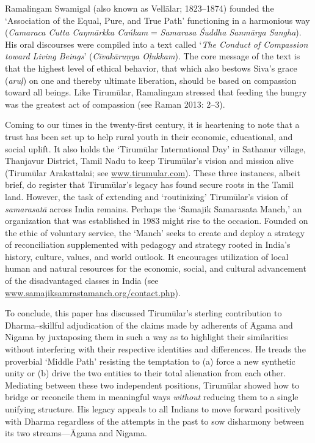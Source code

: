 Ramalingam Swamigal (also known as Vellālar; 1823–1874) founded the ‘Association of the Equal, Pure, and True Path’ functioning in a harmonious way (\textit{Camaraca Cutta Caŋmārkka Cańkam} = \textit{Samarasa Śuddha Sanmārga Sangha}). His oral discourses were compiled into a text called ‘\textit{The Conduct of Compassion toward Living Beings}’ (\textit{Cīvakāruṇya Oļukkam}). The core message of the text is that the highest level of ethical behavior, that which also bestows Siva’s grace (\textit{aruļ}) on one and thereby ultimate liberation, should be based on compassion toward all beings. Like Tirumūlar, Ramalingam stressed that feeding the hungry was the greatest act of compassion (see Raman 2013: 2–3).

Coming to our times in the twenty-first century, it is heartening to note that a trust has been set up to help rural youth in their economic, educational, and social uplift. It also holds the ‘Tirumūlar International Day’ in Sathanur village, Thanjavur District, Tamil Nadu to keep Tirumūlar’s vision and mission alive (Tirumūlar Arakattalai; see \url{www.tirumular.com}). These three instances, albeit brief, do register that Tirumūlar’s legacy has found secure roots in the Tamil land. However, the task of extending and ‘routinizing’ Tirumūlar’s vision of \textit{samarasatā} across India remains. Perhaps the ‘Samajik Samarasata Manch,’ an organization that was established in 1983 might rise to the occasion. Founded on the ethic of voluntary service, the ‘Manch’ seeks to create and deploy a strategy of reconciliation supplemented with pedagogy and strategy rooted in India’s history, culture, values, and world outlook. It encourages utilization of local human and natural resources for the economic, social, and cultural advancement of the disadvantaged classes in India (see \url{www.samajiksamrastamanch.org/contact.php}).

To conclude, this paper has discussed Tirumūlar’s sterling contribution to Dharma--skillful adjudication of the claims made by adherents of Āgama and Nigama by juxtaposing them in such a way as to highlight their similarities without interfering with their respective identities and differences. He treads the proverbial ‘Middle Path’ resisting the temptation to (a) force a new synthetic unity or (b) drive the two entities to their total alienation from each other. Mediating between these two independent positions, Tirumūlar showed how to bridge or reconcile them in meaningful ways \textit{without} reducing them to a single unifying structure. His legacy appeals to all Indians to move forward positively with Dharma regardless of the attempts in the past to sow disharmony between its two streams—Āgama and Nigama.


